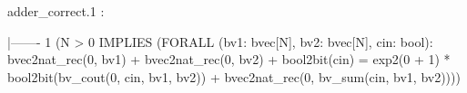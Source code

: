 adder_correct.1 :   

  |-------
{1}   (N > 0
         IMPLIES
         (FORALL
          (bv1: bvec[N], bv2: bvec[N], cin: bool):
            bvec2nat_rec(0, bv1) + bvec2nat_rec(0, bv2)
              + bool2bit(cin)
              = exp2(0 + 1) * bool2bit(bv_cout(0, cin, bv1, bv2))
                  + bvec2nat_rec(0, bv_sum(cin, bv1, bv2))))
